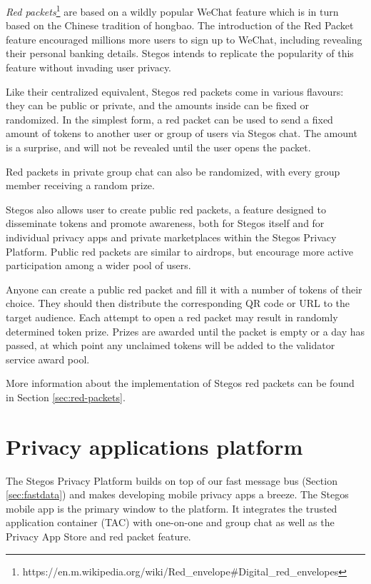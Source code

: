 \documentclass[8pt,fleqn,openany]{book}
\begin{document}
\textit{Red packets}\footnote{https://en.m.wikipedia.org/wiki/Red\_envelope\#Digital\_red\_envelopes} are based on a wildly popular WeChat feature which is in turn based on the Chinese tradition of hongbao. The introduction of the Red Packet feature encouraged millions more users to sign up to WeChat, including revealing their personal banking details. Stegos intends to replicate the popularity of this feature without invading user privacy.

Like their centralized equivalent, Stegos red packets come in various flavours: they can be public or private, and the amounts inside can be fixed or randomized. In the simplest form, a red packet can be used to send a fixed amount of tokens to another user or group of users via Stegos chat. The amount is a surprise, and will not be revealed until the user opens the packet.

Red packets in private group chat can also be randomized, with every group member receiving a random prize. 

Stegos also allows user to create public red packets, a feature designed to disseminate tokens and promote awareness, both for Stegos itself and for individual privacy apps and private marketplaces within the Stegos Privacy Platform. Public red packets are similar to airdrops, but encourage more active participation among a wider pool of users. 

Anyone can create a public red packet and fill it with a number of tokens of their choice. They should then distribute the corresponding QR code or URL to the target audience. Each attempt to open a red packet may result in randomly determined token prize. Prizes are awarded until the packet is empty or a day has passed, at which point any unclaimed tokens will be added to the validator service award pool.

More information about the implementation of Stegos red packets can be found in Section \ref{sec:red-packets}.
		
\chapter{Privacy applications platform}\label{chap:privacy-app-platform}
The Stegos Privacy Platform builds on top of our fast message bus (Section \ref{sec:fastdata}) and makes developing mobile privacy apps a breeze. The Stegos mobile app is the primary window to the platform. It integrates the trusted application container (TAC) with one-on-one and group chat as well as the Privacy App Store and red packet feature. 
\end{document}
